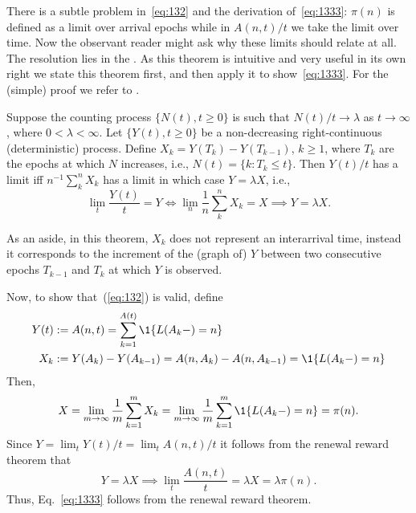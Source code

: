 There is a subtle problem in~\eqref{eq:132} and the derivation
of~\eqref{eq:1333}: $\pi(n)$ is defined as a limit over arrival epochs
while in $A(n,t)/t$ we take the limit over time. Now the observant
reader might ask why these limits should relate at all.  The
resolution lies in the . As this
theorem is intuitive and very useful in its own right we state this
theorem first, and then apply it to show~\eqref{eq:1333}. For the (simple) proof we refer to \citet{el-taha98:_sampl_path_analy_queuein_system}.

\begin{theorem}[Renewal Reward Theorem, $Y=\lambda X$]
  Suppose the counting process $\{N(t), t\geq 0\}$ is such that
  $N(t)/t\to\lambda$ as $t\to\infty$, where $0<\lambda < \infty$. Let
  $\{Y(t), t\geq 0\}$ be a non-decreasing right-continuous
  (deterministic) process. Define $X_k = Y(T_k)-Y(T_{k-1})$,
  $k\geq 1$, where $T_k$ are the epochs at which $N$ increases, i.e.,
  $N(t) = \{k : T_k \leq t\}$. Then $Y(t)/t$ has a limit iff
  $n^{-1}\sum_k^n X_k$ has a limit in which case $Y=\lambda X$, i.e.,
  \begin{equation*}
  \lim_t \frac{Y(t)}t=Y \iff \lim_n \frac 1n\sum_k^n X_k =X \implies Y=\lambda X.
  \end{equation*}
\end{theorem}
 
As an aside, in this theorem, $X_k$ does not represent an interarrival
time, instead it corresponds to the increment of the (graph of) $Y$
between two consecutive epochs $T_{k-1}$ and $T_k$ at which $Y$ is
observed. 


Now, to show that~(\ref{eq:132}) is valid, define
\begin{align*}
  Y(t) &:= A(n,t) = \sum_{k=1}^{A(t)} \1{L(A_k-) = n} \\
X_k &:= Y(A_k) - Y(A_{k-1}) = A(n, A_k) - A(n, A_{k-1}) = \1{L(A_k-)=n}
\end{align*}
Then, 
\begin{equation*}
X= \lim_{m\to\infty} \frac 1 m \sum_{k=1}^m X_k =\lim_{m\to\infty} \frac 1 m \sum_{k=1}^m \1{L(A_k-)=n} = \pi(n).
\end{equation*}
Since $Y=\lim_t Y(t)/t = \lim_t A(n,t)/t$ it follows from the renewal reward theorem that
\begin{equation*}
  Y=\lambda X \implies \lim_t \frac{A(n,t)} t = \lambda X = \lambda \pi(n).
\end{equation*}
Thus, Eq.~\eqref{eq:1333} follows from the renewal reward theorem.

